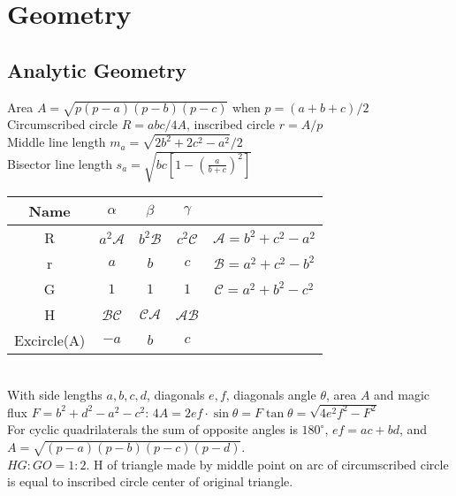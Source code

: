 \chapter{Geometry}

\section{Analytic Geometry}
Area $A = \sqrt{p(p-a)(p-b)(p-c)}$ when $p = (a+b+c)/2$ \\
Circumscribed circle $R = abc/4A$, inscribed circle $r = A/p$ \\ 
Middle line length $m_a = \sqrt{2b^2+2c^2-a^2}/2$ \\
Bisector line length $s_a=\sqrt{bc[1-(\frac{a}{b+c})^2]}$ \\
\begin{tabular}{|c|c|c|c|c|}
  Name & $\alpha$ & $\beta$ & $\gamma$ & \\ \hline
  R & $a^2\mathcal{A}$ & $b^2\mathcal{B}$ & $c^2\mathcal{C}$ & $\mathcal{A}=b^2+c^2-a^2$ \\
  r & $a$ & $b$ & $c$ & $\mathcal{B} = a^2 + c^2 - b^2$ \\
  G & $1$ & $1$ & $1$ & $\mathcal{C} = a^2 + b^2 - c^2$ \\
  H & $\mathcal{BC}$ & $\mathcal{CA}$ & $\mathcal{AB}$ & \\
  Excircle(A) & $-a$ & $b$ & $c$ & 
\end{tabular} \\
With side lengths $a,b,c,d$, diagonals $e, f$, diagonals angle $\theta$, area $A$ and
magic flux $F=b^2+d^2-a^2-c^2$: $4A = 2ef \cdot \sin\theta = F\tan\theta = \sqrt{4e^2f^2-F^2}$ \\
For cyclic quadrilaterals the sum of opposite angles is $180^\circ$,
$ef = ac + bd$, and $A = \sqrt{(p-a)(p-b)(p-c)(p-d)}$. \\
$HG:GO=1:2$. H of triangle made by middle point on arc of circumscribed circle is equal to inscribed circle center of original triangle. \\


